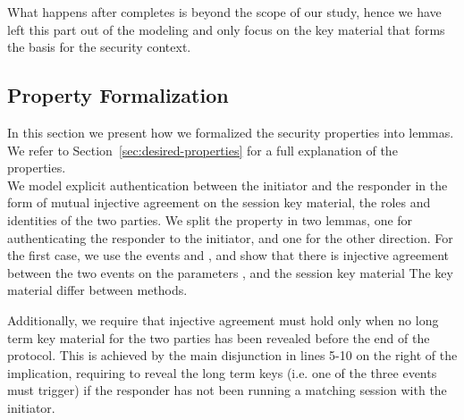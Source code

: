 What happens after \mEdhoc{} completes is beyond the scope of our study, hence
we have left this part out of the modeling and only focus on the key material
that forms the basis for the \mOscore{} security context.
%

\subsection{Property Formalization}
\label{sec:propertyFormalization}
In this section we present how we formalized the security properties into
\mTamarin{} lemmas.
%
We refer to Section~\ref{sec:desired-properties} for a full explanation of the
properties.
\\

We model explicit authentication between the initiator and the
responder in the form of mutual injective agreement on the session key material,
the roles and identities of the two parties.
%
We split the property in two lemmas, one for authenticating the responder to the
initiator, and one for the other direction.
%
For the first case, we use the events  and
, and show that there is injective agreement
between the two events on the parameters ,
 and the session key material 
%
The key material differ between \mEdhoc{} methods.
%

Additionally, we require that injective agreement must hold only when
no long term key material for the two parties has been revealed before
the end of the protocol.
%
This is achieved by the main disjunction in lines 5-10 on the right of
the implication, requiring to reveal the long term keys (i.e. one of
the three  events must trigger) if the responder has
not been running a matching session with the initiator.



